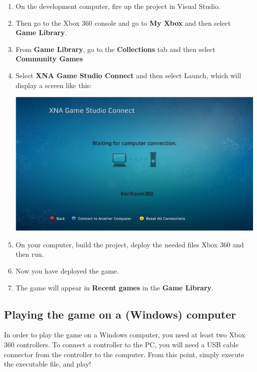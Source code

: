 \begin{enumerate}	
	\item On the development computer, fire up the project in Visual Studio.
	\item Then go to the Xbox 360 console and go to \textbf{My Xbox} and then select \textbf{Game Library}. 
	\item From \textbf{Game Library}, go to the \textbf{Collections} tab and then select \textbf{Community Games}
	\item Select \textbf{XNA Game Studio Connect} and then select Launch, which will display a screen like this: \\ \begin{center}\includegraphics[scale=0.5]{graphics/connect2}\end{center}
	\item On your computer, build the project, deploy the needed files Xbox 360 and then run.
	\item Now you have deployed the game. 
	\item The game will appear in \textbf{Recent games} in the \textbf{Game Library}.	 
\end{enumerate}

\subsection{Playing the game on a (Windows) computer}

In order to play the game on a Windows computer, you need at least two Xbox 360 controllers. To connect a controller to the PC, you will need a USB cable connector from the controller to the computer. From this point, simply execute the executable file, and play! 



